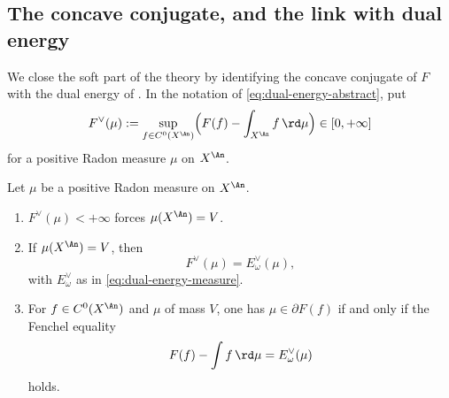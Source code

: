 \subsection{The concave conjugate, and the link with dual energy}
\label{sec:ch27-conjugate}

We close the soft part of the theory by identifying the concave conjugate of
\(F\) with the dual energy of .  In
the notation of \eqref{eq:dual-energy-abstract}, put
\begin{equation}\label{eq:ch27-F-conjugate}
 F^\vee(\mu):=\sup_{f\in C^0(X^{\An})}
   \Bigl(F(f)-\int_{X^{\An}}f\,\rd\mu\Bigr)
 \in[0,+\infty]
\end{equation}
for a positive Radon measure \(\mu\) on \(X^{\An}\).

\begin{proposition}
\label{prop:ch27-conjugate-identification}
Let \(\mu\) be a positive Radon measure on \(X^{\An}\).
\begin{enumerate}
\item \(F^\vee(\mu)<+\infty\) forces \(\mu(X^{\An})=V\).
\item If \(\mu(X^{\An})=V\), then
\begin{equation}\label{eq:ch27-conjugates-agree}
 F^\vee(\mu)=E_\omega^\vee(\mu),
\end{equation}
with \(E^\vee_\omega\) as in \eqref{eq:dual-energy-measure}.
\item For \(f\in C^0(X^{\An})\) and \(\mu\) of mass \(V\), one has
\(\mu\in\partial F(f)\) if and only if the Fenchel equality
\begin{equation}\label{eq:ch27-fenchel-equality}
 F(f)-\int f\,\rd\mu=E^\vee_\omega(\mu)
\end{equation}
holds.
\end{enumerate}
\end{proposition}

